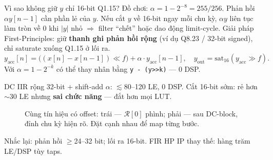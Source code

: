 \begin{firstprin}{Vì sao không giữ $y$ chỉ 16-bit Q1.15?}
Đồ chơi: $\alpha=1-2^{-8}=255/256$. Phản hồi $\alpha y[n-1]$ cần phần lẻ của $y$. Nếu cắt $y$ về 16-bit ngay mỗi chu kỳ, $\alpha y$ liên tục làm tròn về 0 khi $|y|$ nhỏ $\Rightarrow$ filter ``chết'' hoặc dao động limit-cycle. Giải pháp First-Principles: giữ \textbf{thanh ghi phản hồi rộng} (ví dụ Q8.23 / 32-bit signed), chỉ saturate xuống Q1.15 ở lối ra.
\[
y_{\text{acc}}[n] = \big((x[n]-x[n-1])\ll f\big) + \alpha\cdot y_{\text{acc}}[n-1],\quad
y_{\text{out}} = \mathrm{sat}_{16}(y_{\text{acc}}\gg f).
\]
Với $\alpha=1-2^{-k}$ có thể thay nhân bằng \texttt{y - (y>>k)} --- 0 DSP.
\end{firstprin}

\begin{costbox}
DC IIR rộng 32-bit + shift-add $\alpha$: $\lesssim$80--120 LE, 0 DSP. Cắt 16-bit sớm: rẻ hơn $\sim$30 LE nhưng \textbf{sai chức năng} --- đắt hơn mọi LUT.
\end{costbox}

\begin{figure}[H]
\centering
{}
\caption{Cùng tín hiệu có offset: trái --- $\mathcal{R}[0]$ phình; phải --- sau DC-block, đỉnh chu kỳ hiện rõ. Đặt cạnh nhau để map từng bước.}
\label{fig:dc_before_after}
\end{figure}

\begin{costbox}
Nhắc lại: phản hồi $\ge$24--32 bit; lối ra 16-bit. FIR HP IP thay thế: hàng trăm LE/DSP tùy taps.
\end{costbox}

